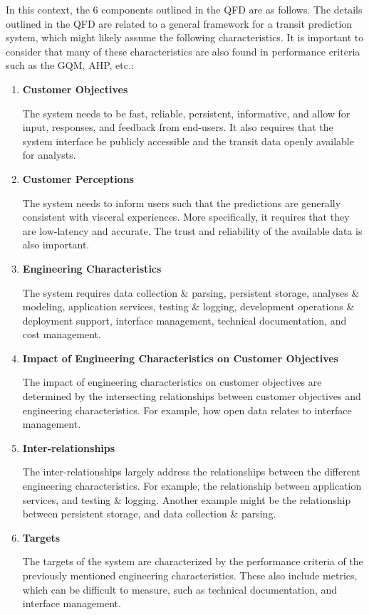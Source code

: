 \documentclass{article}
\begin{document}
In this context, the 6 components outlined in the QFD are as follows. The details outlined in the QFD are related to a general framework for a transit prediction system, which might likely assume the following characteristics. It is important to consider that many of these characteristics are also found in performance criteria such as the GQM, AHP, etc.:
\begin{enumerate}
    \item \textbf{Customer Objectives}
    
    The system needs to be fast, reliable, persistent, informative, and allow for input, responses, and feedback from end-users. It also requires that the system interface be publicly accessible and the transit data openly available for analysts.
    
    \item \textbf{Customer Perceptions}
    
    The system needs to inform users such that the predictions are generally consistent with visceral experiences. More specifically, it requires that they are low-latency and accurate. The trust and reliability of the available data is also important.
    
    \item \textbf{Engineering Characteristics}

    The system requires data collection \& parsing, persistent storage, analyses \& modeling, application services, testing \& logging, development operations \& deployment support, interface management, technical documentation, and cost management.
    
    \item \textbf{Impact of Engineering Characteristics on Customer Objectives}

    The impact of engineering characteristics on customer objectives are determined by the intersecting relationships between customer objectives and engineering characteristics. For example, how open data relates to interface management.

\newpage
    \item \textbf{Inter-relationships}

    The inter-relationships largely address the relationships between the different engineering characteristics. For example, the relationship between application services, and testing \& logging. Another example might be the relationship between persistent storage, and data collection \& parsing.
    
    \item \textbf{Targets}

    The targets of the system are characterized by the performance criteria of the previously mentioned engineering characteristics. These also include metrics, which can be difficult to measure, such as technical documentation, and interface management.
    
\end{enumerate}
\end{document}
